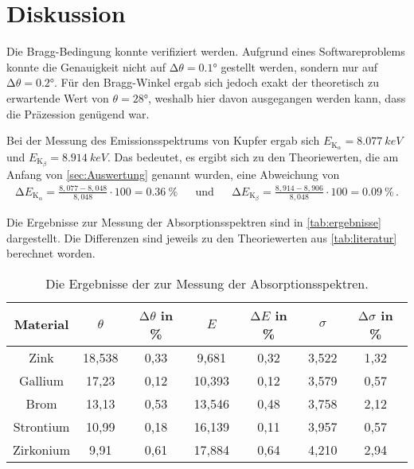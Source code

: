 \section{Diskussion}
\label{sec:Diskussion}

Die Bragg-Bedingung konnte verifiziert werden.
Aufgrund eines Softwareproblems konnte die Genauigkeit nicht auf $\increment \theta = 0.1 °$ gestellt werden, sondern nur auf $\increment \theta = 0.2 °$.
Für den Bragg-Winkel ergab sich jedoch exakt der theoretisch zu erwartende Wert von $\theta = 28°$, weshalb hier davon ausgegangen werden kann, dass die Präzession genügend war.

Bei der Messung des Emissionsspektrums von Kupfer ergab sich $ E_{\text{K}_\alpha} = \qty{8.077}{keV}$ und $E_{\text{K}_\beta} = \qty{8.914}{keV}$.
Das bedeutet, es ergibt sich zu den Theoriewerten, die am Anfang von \autoref{sec:Auswertung} genannt wurden, eine Abweichung von
\begin{align*}
    \increment E_{\text{K}_\alpha} = \frac{8,077 - 8,048}{8,048} \cdot 100 = \qty{0.36}{\%} 
    &&\text{und}&&
    \increment E_{\text{K}_\beta} = \frac{8,914 - 8,906}{8,048} \cdot 100 = \qty{0.09}{\%} \, .
\end{align*}

Die Ergebnisse zur Messung der Absorptionsspektren sind in \autoref{tab:ergebnisse} dargestellt.
Die Differenzen sind jeweils zu den Theoriewerten aus \autoref{tab:literatur} berechnet worden.
\begin{table} [H]
    \centering
    \caption{Die Ergebnisse der zur Messung der Absorptionsspektren.}
    \label{tab:ergebnisse}
    \begin{tabular}{c c c c c c c}
        \toprule
        Material & $\theta$ & $\increment \theta$ in \% & $E$ & $\increment E$ in \%& $\sigma$ & $\increment \sigma$ in \%\\
        \midrule
        Zink       & 18,538 & 0,33 & 9,681  & 0,32 & 3,522 & 1,32 \\
        Gallium    & 17,23  & 0,12 & 10,393 & 0,12 & 3,579 & 0,57 \\
        Brom       & 13,13  & 0,53 & 13,546 & 0,48 & 3,758 & 2,12 \\
        Strontium  & 10,99  & 0,18 & 16,139 & 0,11 & 3,957 & 0,57 \\
        Zirkonium  & 9,91   & 0,61 & 17,884 & 0,64 & 4,210 & 2,94 \\
        \bottomrule
    \end{tabular}
\end{table}

